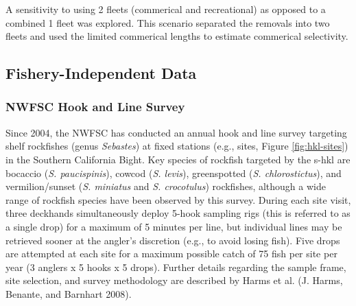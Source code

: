 \documentclass[11pt,
  english,
  a4paper,
]{article}
\begin{document}
A sensitivity to using 2 fleets (commerical and recreational) as opposed to a combined 1 fleet was explored. This scenario separated the removals into two fleets and used the limited commerical lengths to estimate commerical selectivity.

\leavevmode\tagmcend\tagstructend\par


\hypertarget{fishery-independent-data}{%
\subsection{Fishery-Independent Data}\label{fishery-independent-data}}

\leavevmode\tagmcend\tagstructend


\hypertarget{nwfsc-hook-and-line-survey}{%
\subsubsection{NWFSC Hook and Line Survey}\label{nwfsc-hook-and-line-survey}}

\leavevmode\tagmcend\tagstructend


Since 2004, the NWFSC has conducted an annual hook and line survey targeting shelf rockfishes (genus \emph{Sebastes}) at fixed stations (e.g., sites, Figure \ref{fig:hkl-sites}) in the Southern California Bight. Key species of rockfish targeted by the \gls{s-hkl} are bocaccio (\emph{S. paucispinis}), cowcod (\emph{S. levis}), greenspotted (\emph{S. chlorostictus}), and vermilion/sunset (\emph{S. miniatus} and \emph{S. crocotulus}) rockfishes, although a wide range of rockfish species have been observed by this survey. During each site visit, three deckhands simultaneously deploy 5-hook sampling rigs (this is referred to as a single drop) for a maximum of 5 minutes per line, but individual lines may be retrieved sooner at the angler's discretion (e.g., to avoid losing fish). Five drops are attempted at each site for a maximum possible catch of 75 fish per site per year (3 anglers x 5 hooks x 5 drops). Further details regarding the sample frame, site selection, and survey methodology are described by Harms et al. {(J. Harms, Benante, and Barnhart 2008)\leavevmode\tagmcend\tagstructend}.
\end{document}
